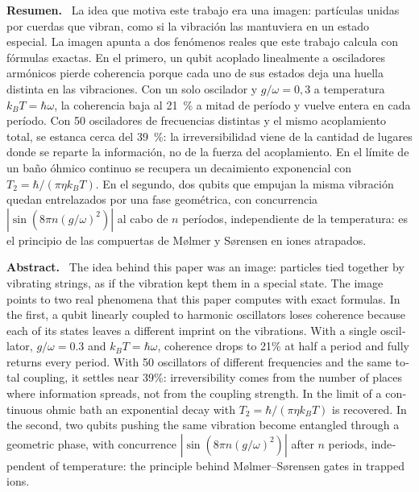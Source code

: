 \documentclass[11pt,a4paper]{article}
\title{\titulo}
\author{Bruno Loiacono\\[2pt]\small Estudiante de Física, Universidad de Buenos Aires}
\date{Noviembre de 2026\\[8pt]\fbox{\small Preprint, documento de trabajo sin revisión por pares}}
\newenvironment{resumen}{\par\noindent\small\textbf{Resumen.}\ }{\par\medskip}
\newenvironment{abstractEN}{\par\noindent\small\begin{otherlanguage}{english}\textbf{Abstract.}\ }{\end{otherlanguage}\par\medskip}
\begin{document}
\maketitle
\thispagestyle{fancy}

\begin{resumen}
La idea que motiva este trabajo era una imagen: partículas unidas por cuerdas que vibran, como si la vibración las mantuviera en un estado especial. La imagen apunta a dos fenómenos reales que este trabajo calcula con fórmulas exactas. En el primero, un qubit acoplado linealmente a osciladores armónicos pierde coherencia porque cada uno de sus estados deja una huella distinta en las vibraciones. Con un solo oscilador y $g/\omega = 0{,}3$ a temperatura $k_BT = \hbar\omega$, la coherencia baja al 21~\% a mitad de período y vuelve entera en cada período. Con 50 osciladores de frecuencias distintas y el mismo acoplamiento total, se estanca cerca del 39~\%: la irreversibilidad viene de la cantidad de lugares donde se reparte la información, no de la fuerza del acoplamiento. En el límite de un baño óhmico continuo se recupera un decaimiento exponencial con $T_2 = \hbar/(\pi\eta k_BT)$. En el segundo, dos qubits que empujan la misma vibración quedan entrelazados por una fase geométrica, con concurrencia $|\sin(8\pi n (g/\omega)^2)|$ al cabo de $n$ períodos, independiente de la temperatura: es el principio de las compuertas de Mølmer y Sørensen en iones atrapados.
\end{resumen}

\begin{abstractEN}
The idea behind this paper was an image: particles tied together by vibrating strings, as if the vibration kept them in a special state. The image points to two real phenomena that this paper computes with exact formulas. In the first, a qubit linearly coupled to harmonic oscillators loses coherence because each of its states leaves a different imprint on the vibrations. With a single oscillator, $g/\omega = 0.3$ and $k_BT = \hbar\omega$, coherence drops to 21\% at half a period and fully returns every period. With 50 oscillators of different frequencies and the same total coupling, it settles near 39\%: irreversibility comes from the number of places where information spreads, not from the coupling strength. In the limit of a continuous ohmic bath an exponential decay with $T_2 = \hbar/(\pi\eta k_BT)$ is recovered. In the second, two qubits pushing the same vibration become entangled through a geometric phase, with concurrence $|\sin(8\pi n (g/\omega)^2)|$ after $n$ periods, independent of temperature: the principle behind Mølmer--Sørensen gates in trapped ions.
\end{abstractEN}
\end{document}

